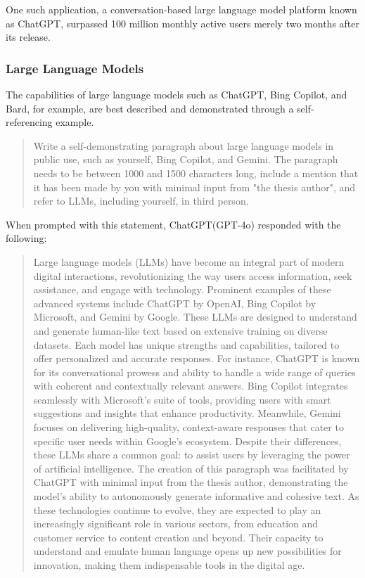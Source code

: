 \documentclass[masterthesis]{fer}
\begin{document}
One such application, a conversation-based large language model platform known as ChatGPT, surpassed 100 million monthly active users merely two months after its release.

\subsubsection{Large Language Models}
The capabilities of large language models such as ChatGPT, Bing Copilot, and Bard, for example, are best described and demonstrated through a self-referencing example.

\begin{quote}
Write a self-demonstrating paragraph about large language models in public use, such as yourself, Bing Copilot, and Gemini.
The paragraph needs to be between 1000 and 1500 characters long, include a mention that it has been made by you with minimal input from "the thesis author", and refer to LLMs, including yourself, in third person.
\end{quote}

When prompted with this statement, ChatGPT(GPT-4o) responded with the following:

\begin{quote}

Large language models (LLMs) have become an integral part of modern digital interactions, revolutionizing the way users access information, seek assistance, and engage with technology. Prominent examples of these advanced systems include ChatGPT by OpenAI, Bing Copilot by Microsoft, and Gemini by Google. These LLMs are designed to understand and generate human-like text based on extensive training on diverse datasets. Each model has unique strengths and capabilities, tailored to offer personalized and accurate responses. For instance, ChatGPT is known for its conversational prowess and ability to handle a wide range of queries with coherent and contextually relevant answers. Bing Copilot integrates seamlessly with Microsoft's suite of tools, providing users with smart suggestions and insights that enhance productivity. Meanwhile, Gemini focuses on delivering high-quality, context-aware responses that cater to specific user needs within Google's ecosystem. Despite their differences, these LLMs share a common goal: to assist users by leveraging the power of artificial intelligence. The creation of this paragraph was facilitated by ChatGPT with minimal input from the thesis author, demonstrating the model's ability to autonomously generate informative and cohesive text. As these technologies continue to evolve, they are expected to play an increasingly significant role in various sectors, from education and customer service to content creation and beyond. Their capacity to understand and emulate human language opens up new possibilities for innovation, making them indispensable tools in the digital age.

\cite{chatgpt2024}
\end{quote}
\end{document}
